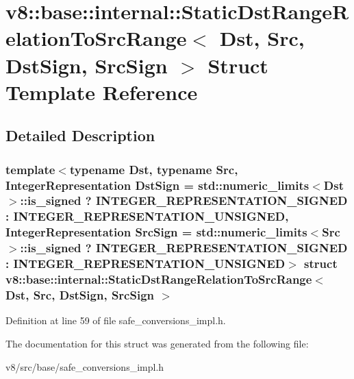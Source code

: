 \hypertarget{structv8_1_1base_1_1internal_1_1StaticDstRangeRelationToSrcRange}{}\section{v8\+:\+:base\+:\+:internal\+:\+:Static\+Dst\+Range\+Relation\+To\+Src\+Range$<$ Dst, Src, Dst\+Sign, Src\+Sign $>$ Struct Template Reference}
\label{structv8_1_1base_1_1internal_1_1StaticDstRangeRelationToSrcRange}


\subsection{Detailed Description}
\subsubsection*{template$<$typename Dst, typename Src, Integer\+Representation Dst\+Sign = std\+::numeric\+\_\+limits$<$\+Dst$>$\+::is\+\_\+signed ? I\+N\+T\+E\+G\+E\+R\+\_\+\+R\+E\+P\+R\+E\+S\+E\+N\+T\+A\+T\+I\+O\+N\+\_\+\+S\+I\+G\+N\+E\+D \+: I\+N\+T\+E\+G\+E\+R\+\_\+\+R\+E\+P\+R\+E\+S\+E\+N\+T\+A\+T\+I\+O\+N\+\_\+\+U\+N\+S\+I\+G\+N\+ED, Integer\+Representation Src\+Sign = std\+::numeric\+\_\+limits$<$\+Src$>$\+::is\+\_\+signed ? I\+N\+T\+E\+G\+E\+R\+\_\+\+R\+E\+P\+R\+E\+S\+E\+N\+T\+A\+T\+I\+O\+N\+\_\+\+S\+I\+G\+N\+E\+D \+: I\+N\+T\+E\+G\+E\+R\+\_\+\+R\+E\+P\+R\+E\+S\+E\+N\+T\+A\+T\+I\+O\+N\+\_\+\+U\+N\+S\+I\+G\+N\+ED$>$\newline
struct v8\+::base\+::internal\+::\+Static\+Dst\+Range\+Relation\+To\+Src\+Range$<$ Dst, Src, Dst\+Sign, Src\+Sign $>$}



Definition at line 59 of file safe\+\_\+conversions\+\_\+impl.\+h.



The documentation for this struct was generated from the following file\+:\begin{DoxyCompactItemize}
\item 
v8/src/base/safe\+\_\+conversions\+\_\+impl.\+h\end{DoxyCompactItemize}
